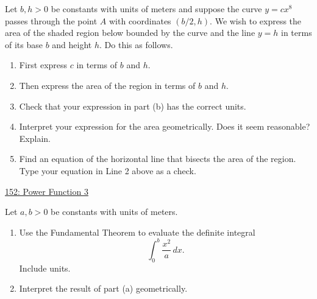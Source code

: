 \documentclass{ximera}
\begin{document}
\begin{question} \label{QOLDefeefKRerbttp}
Let $b,h>0$ be constants with units of meters and suppose the curve $y=cx^8$ passes through the point $A$ with coordinates $(b/2,h)$. We wish to express the area of the shaded region below bounded by the curve and the line $y=h$ in terms of its base $b$ and height $h$. Do this as follows.

\begin{enumerate}

\item First express $c$ in terms of $b$ and $h$.

\item Then express the area of the region in terms of $b$ and $h$.

\item Check that your expression in part (b) has the correct units. 

\item Interpret  your expression for the area geometrically. Does it seem reasonable? Explain. 

\item Find an equation of the horizontal line that bisects the area of the region. Type your equation in Line 2 above as a check. 

\end{enumerate}

\begin{onlineOnly}
    \begin{center}
\end{center}
\end{onlineOnly}

\href{https://www.desmos.com/calculator/egdpe7cccl}{152: Power Function 3}

\end{question}




\begin{question} \label{QOidfsfer}
Let $a,b>0$ be constants with units of meters.
\begin{enumerate}
\item Use the Fundamental Theorem to evaluate the definite integral
\[
   \int_0^b \frac{x^2}{a}\, dx . 
\]
Include units.

\item Interpret the result of part (a) geometrically.
\end{enumerate}

\end{question}
\end{document}
